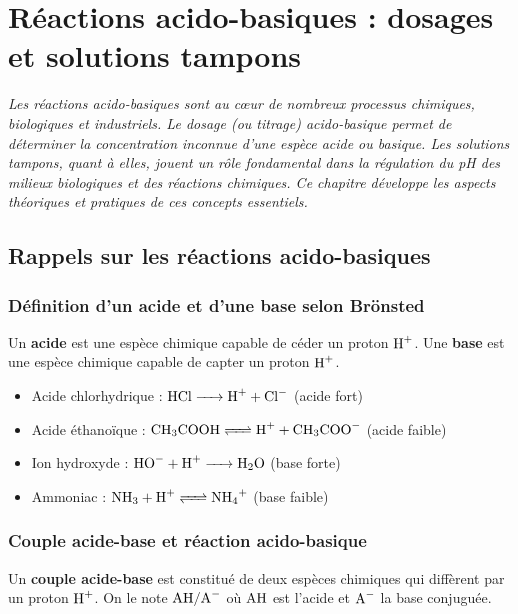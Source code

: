\chapter{Réactions acido-basiques : dosages et solutions tampons}

\textit{Les réactions acido-basiques sont au cœur de nombreux processus chimiques, biologiques et industriels. Le dosage (ou titrage) acido-basique permet de déterminer la concentration inconnue d'une espèce acide ou basique. Les solutions tampons, quant à elles, jouent un rôle fondamental dans la régulation du pH des milieux biologiques et des réactions chimiques. Ce chapitre développe les aspects théoriques et pratiques de ces concepts essentiels.}

\section{Rappels sur les réactions acido-basiques}

\subsection{Définition d'un acide et d'une base selon Brönsted}

\begin{definition}
Un \textbf{acide} est une espèce chimique capable de céder un proton $\ce{H+}$. Une \textbf{base} est une espèce chimique capable de capter un proton $\ce{H+}$.
\end{definition}

\begin{exemple}
\begin{itemize}
    \item Acide chlorhydrique : $\ce{HCl -> H+ + Cl-}$ (acide fort)
    \item Acide éthanoïque : $\ce{CH3COOH <=> H+ + CH3COO-}$ (acide faible)
    \item Ion hydroxyde : $\ce{HO- + H+ -> H2O}$ (base forte)
    \item Ammoniac : $\ce{NH3 + H+ <=> NH4+}$ (base faible)
\end{itemize}
\end{exemple}

\subsection{Couple acide-base et réaction acido-basique}

\begin{definition}
Un \textbf{couple acide-base} est constitué de deux espèces chimiques qui diffèrent par un proton $\ce{H+}$. On le note $\ce{AH/A-}$ où $\ce{AH}$ est l'acide et $\ce{A-}$ la base conjuguée.
\end{definition}

